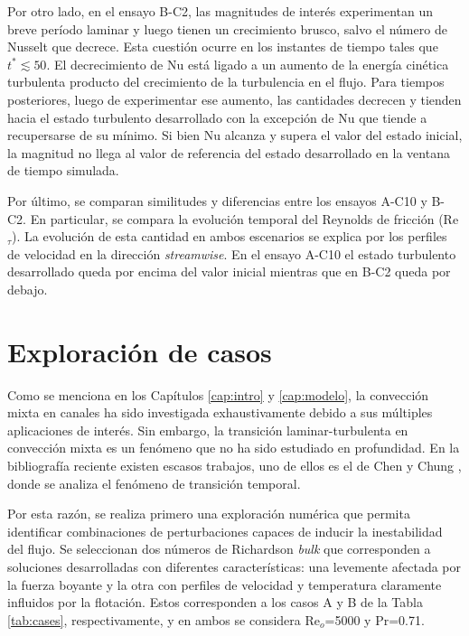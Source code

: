 Por otro lado, en el ensayo B-C2, las magnitudes de interés experimentan un breve período laminar y luego tienen un crecimiento brusco, salvo el número de Nusselt que decrece. Esta cuestión ocurre en los instantes de tiempo tales que $t^*\lesssim 50$. El decrecimiento de Nu está ligado a un aumento de la energía cinética turbulenta producto del crecimiento de la turbulencia en el flujo. Para tiempos posteriores, luego de experimentar ese aumento, las cantidades decrecen y tienden hacia el estado turbulento desarrollado con la excepción de Nu que tiende a recupersarse de su mínimo. Si bien Nu alcanza y supera el valor del estado inicial, la magnitud no llega al valor de referencia del estado desarrollado en la ventana de tiempo simulada. 

Por último, se comparan similitudes y diferencias entre los ensayos A-C10 y B-C2. En particular, se compara la evolución temporal del Reynolds de fricción (Re$_{\tau}$). La evolución de esta cantidad en ambos escenarios se explica por los perfiles de velocidad en la dirección \textit{streamwise}. En el ensayo A-C10 el estado turbulento desarrollado queda por encima del valor inicial mientras que en B-C2 queda por debajo.


\section{Exploración de casos} \label{sec:explo}

Como se menciona en los Capítulos \ref{cap:intro} y \ref{cap:modelo}, la convección mixta en canales ha sido investigada exhaustivamente debido a sus múltiples aplicaciones de interés. Sin embargo, la transición laminar-turbulenta en convección mixta es un fenómeno que no ha sido estudiado en profundidad. En la bibliografía reciente existen escasos trabajos, uno de ellos es el de Chen y Chung \cite{chen2003direct}, donde se analiza el fenómeno de transición temporal.

Por esta razón, se realiza primero una exploración numérica que permita identificar combinaciones de perturbaciones capaces de inducir la inestabilidad del flujo. Se seleccionan dos números de Richardson \textit{bulk} que corresponden a soluciones desarrolladas con diferentes \linebreak características: una levemente afectada por la fuerza boyante y la otra con perfiles de velocidad y temperatura claramente influidos por la flotación. Estos corresponden a los casos A y B de la Tabla \ref{tab:cases}, respectivamente, y en ambos se considera Re$_o$=5000 y Pr=0.71.

